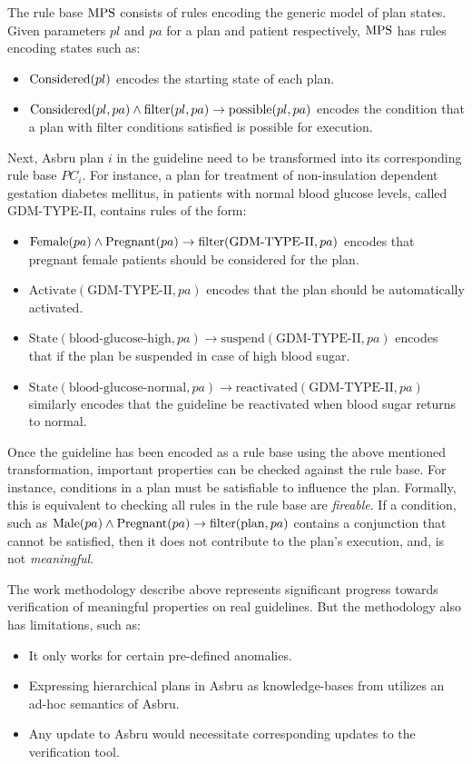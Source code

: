 The rule base $\text{MPS}{}$ consists of rules encoding the generic model of plan
states. Given parameters $pl$ and $pa$ for a plan and patient respectively,
$\text{MPS}{}$ has rules encoding states such as:
\begin{itemize}
  \item $\text{Considered}(pl)$ encodes the starting state of each plan.
  \item $\text{Considered}(pl,pa) \wedge \text{filter}(pl,pa) \to \text{possible}(pl,pa)$
    encodes the condition that a plan with filter conditions satisfied
    is possible for execution.
\end{itemize}

Next, Asbru plan $i$ in the guideline need to be transformed into
its corresponding rule base $PC_i$. For instance, a plan for
treatment of non-insulation dependent gestation diabetes mellitus,
in patients with normal blood glucose levels, called GDM-TYPE-II,
contains rules of the form:
\begin{itemize}
  \item $\text{Female}(pa) \wedge \text{Pregnant}(pa) \to \text{filter}(\text{GDM-TYPE-II}, pa)$
    encodes that pregnant female patients should be considered for the plan.
  \item $\text{Activate}(\text{GDM-TYPE-II}, pa)$ encodes that the plan should
    be automatically activated.
  \item $\text{State}(\text{blood-glucose-high}, pa) \to \text{suspend}(\text{GDM-TYPE-II},pa)$
    encodes that if the plan be suspended in case of high blood sugar.
  \item $\text{State}(\text{blood-glucose-normal}, pa) \to \text{reactivated}(\text{GDM-TYPE-II},pa)$
    similarly encodes that the guideline be reactivated when blood sugar returns
    to normal.
\end{itemize}

Once the guideline has been encoded as a rule base using the above mentioned
transformation, important properties can be checked against the rule base.
For instance, conditions in a plan must be satisfiable to
influence the plan. Formally, this is equivalent to checking
all rules in the rule base are \emph{fireable}. If a condition,
such as $\text{Male}(pa) \wedge \text{Pregnant}(pa) \to \text{filter}(\text{plan}, pa)$
contains a conjunction that cannot be satisfied, then it does not contribute
to the plan's execution, and, is not \emph{meaningful}.

The work methodology describe above represents significant progress towards
verification of meaningful properties on real guidelines. But the methodology
also has limitations, such as:
\begin{itemize}
  \item It only works for certain pre-defined anomalies.
  \item Expressing hierarchical plans in Asbru as knowledge-bases from
    \cite{PreeceJIS94} utilizes an ad-hoc semantics of Asbru.
  \item Any update to Asbru would necessitate corresponding updates to
    the verification tool.
\end{itemize}

